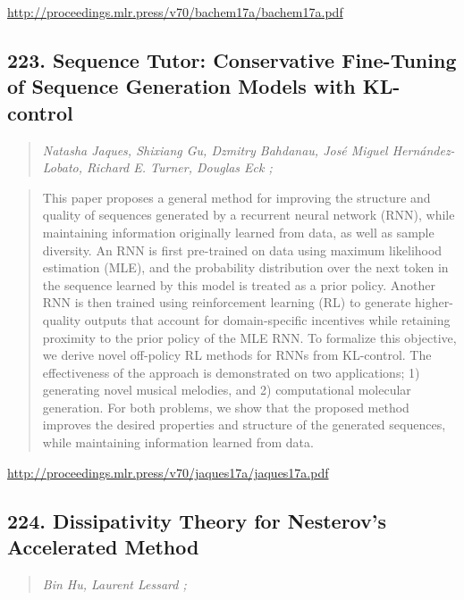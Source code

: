 \documentclass{article}
\begin{document}
\href{http://proceedings.mlr.press/v70/bachem17a/bachem17a.pdf}{http://proceedings.mlr.press/v70/bachem17a/bachem17a.pdf}

\subsection{223. Sequence Tutor: Conservative Fine-Tuning of Sequence Generation Models with KL-control}

\begin{quote}
\footnotesize{\textit{Natasha Jaques, Shixiang Gu, Dzmitry Bahdanau, José Miguel Hernández-Lobato, Richard E. Turner, Douglas Eck ;}}

\end{quote}

\begin{quote}
    This paper proposes a general method for improving the structure and quality of sequences generated by a recurrent neural network (RNN), while maintaining information originally learned from data, as well as sample diversity. An RNN is first pre-trained on data using maximum likelihood estimation (MLE), and the probability distribution over the next token in the sequence learned by this model is treated as a prior policy. Another RNN is then trained using reinforcement learning (RL) to generate higher-quality outputs that account for domain-specific incentives while retaining proximity to the prior policy of the MLE RNN. To formalize this objective, we derive novel off-policy RL methods for RNNs from KL-control. The effectiveness of the approach is demonstrated on two applications; 1) generating novel musical melodies, and 2) computational molecular generation. For both problems, we show that the proposed method improves the desired properties and structure of the generated sequences, while maintaining information learned from data.  
\end{quote}

\href{http://proceedings.mlr.press/v70/jaques17a/jaques17a.pdf}{http://proceedings.mlr.press/v70/jaques17a/jaques17a.pdf}

\subsection{224. Dissipativity Theory for Nesterov’s Accelerated Method}

\begin{quote}
\footnotesize{\textit{Bin Hu, Laurent Lessard ;}}

\end{quote}
\end{document}
